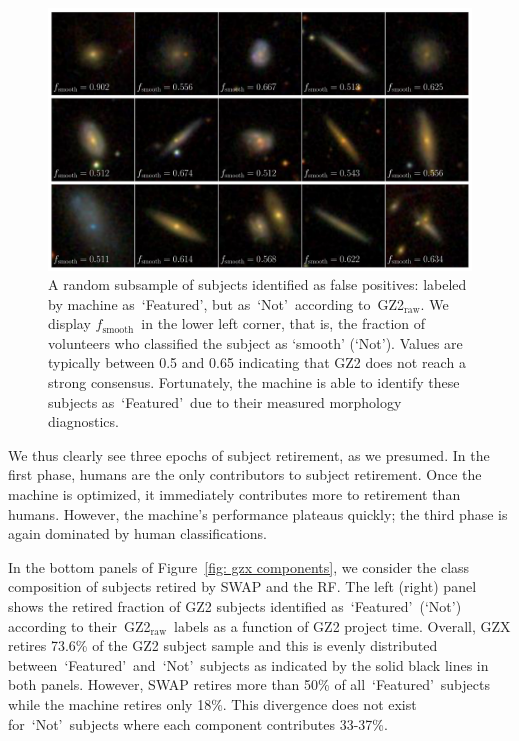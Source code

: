 \documentclass[twocolumn]{aastex6}
\newcommand{\feat}{`Featured'}
\newcommand{\notfeat}{`Not'}
\newcommand{\raw}{GZ2$_{\text{raw}}$}
\newcommand{\fsmooth}{$f_{\mathrm{smooth}}$}
\begin{document}
\begin{figure}[t!]
\centering
\includegraphics[width=6.5in]{figures/machine_false_positives_jpgs.pdf}
\caption{A random subsample of subjects identified as false positives: labeled by machine as~\feat, but as~\notfeat~according to~\raw. We display \fsmooth~in the lower left corner, that is, the fraction of volunteers who classified the subject as `smooth' (\notfeat). Values are typically between 0.5 and 0.65 indicating that GZ2 does not reach a strong consensus. Fortunately, the machine is able to identify these subjects as~\feat~due to their measured morphology diagnostics. \label{fig: machine false pos}}
\end{figure}

We thus clearly see three epochs of subject retirement, as we presumed.
In the first phase, humans are the only contributors to subject retirement.  
Once the machine is optimized, it immediately contributes more to retirement than humans.
However, the machine's performance plateaus quickly;  the third 
phase is again dominated by human classifications.

In the bottom panels of Figure~\ref{fig: gzx components}, we consider the class
composition of subjects retired by SWAP and the RF. 
The left (right) panel shows the retired fraction of GZ2 subjects identified 
as~\feat~(\notfeat) according to their~\raw~labels as a function of GZ2 project time. 
Overall, GZX retires 73.6\% of the GZ2 subject sample and this is evenly 
distributed between~\feat~and~\notfeat~subjects as indicated by the solid
black lines in both panels. 
However, SWAP retires more than 50\% of all~\feat~subjects while the machine
retires only 18\%. This divergence does not exist for~\notfeat~subjects where
each component contributes 33-37\%. 
\end{document}
